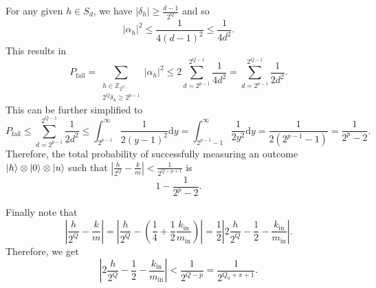 \documentclass[a4paper, oneside, 12pt]{amsart}
\begin{document}
\begin{remark}
 For any given \(h \in S_d\), we have  \(|\delta_h| \geq \frac{d-1}{2^Q}\) and so
  \begin{equation*}
    |\alpha_h|^2 \leq \frac{1}{4(d-1)^2} \leq \frac{1}{4d^2}.
  \end{equation*}
  This results in
  \begin{equation*}
    P_{\text{fail}}
    = \sum_{\substack{ h\in \mathbb{Z}_{2^{Q}}\\ 2^{Q}\delta_{h}\geq 2^{p-1}}} |\alpha_{h}|^{2}
    \leq 2 \sum_{d=2^{p-1}}^{2^{Q-1}} \frac{1}{4d^2}
    = \sum_{d=2^{p-1}}^{2^{Q-1}} \frac{1}{2d^2}.
  \end{equation*}
  This can be further simplified to
  \begin{equation*}
    P_{\text{fail}}
    \leq \sum_{d=2^{p-1}}^{2^{Q-1}} \frac{1}{2d^2}
    \leq \int_{2^{p-1}}^{\infty} \frac{1}{2(y-1)^2} \mathrm{d}y
    = \int_{2^{p-1}-1}^{\infty} \frac{1}{2y^2} \mathrm{d}y
    = \frac{1}{2(2^{p-1}-1)}
    = \frac{1}{2^p - 2}.
  \end{equation*}
  Therefore, the total probability of successfully measuring an outcome \(\lvert h\rangle \otimes \lvert0\rangle \otimes \lvert u\rangle\) such that \(\left|\frac{h}{2^{Q}} - \frac{k}{m} \right| < \frac{1}{2^{Q-p+1}}\) is
  \begin{equation*}
    1 - \frac{1}{2^p - 2}.
  \end{equation*}

  Finally note that
  \begin{equation*}
    \left|\frac{h}{2^Q} - \frac{k}{m}\right|
    = \left|\frac{h}{2^Q} - \left(\frac{1}{4} + \frac{1}{2}\frac{k_{\mathrm{in}}}{m_{\mathrm{in}}}\right)\right|
    = \frac{1}{2}\left|2\frac{h}{2^{Q}} - \frac{1}{2} - \frac{k_{\mathrm{in}}}{m_{\mathrm{in}}} \right|.
  \end{equation*}
  Therefore, we get
  \begin{equation*}
    \left|2\frac{h}{2^{Q}} - \frac{1}{2}  - \frac{k_{\mathrm{in}}}{m_{\mathrm{in}}} \right| < \frac{1}{2^{Q-p}}= \frac{1}{2^{Q_{0} + x + 1}}.
  \end{equation*}
\end{remark}
\end{document}
